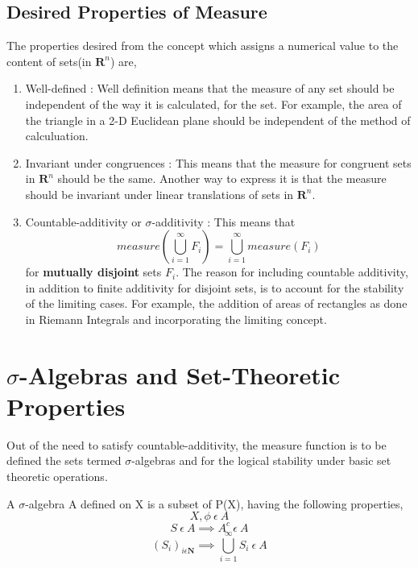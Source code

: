 \subsection{Desired Properties of Measure}
The properties desired from the concept which assigns a numerical value to the
content of sets(in $\bm{R}^n$) are,
\begin{enumerate}
    \item Well-defined : Well definition means that the measure of any set
        should be independent of the way it is calculated, for the set. For
        example, the area of the triangle in a 2-D Euclidean plane should be
        independent of the method of calculuation.
    \item Invariant under congruences : This means that the measure for
        congruent sets in $\bm{R}^n$ should be the same. Another way to express
        it is that the measure should be invariant under linear translations of
        sets in $\bm{R}^n$.
    \item Countable-additivity or $\sigma$-additivity : This means that 
        \begin{equation}
            measure(\bigcup_{i=1}^{\infty} F_{i}) = \bigcup_{i=1}^{\infty}
            measure(F_{i}) 
        \end{equation}
        for \textbf{mutually disjoint} sets $F_{i}$.
        The reason for including countable additivity, in addition to finite
        additivity for disjoint sets, is to account for the stability of the
        limiting cases. For example, the addition of areas of rectangles as done
        in Riemann Integrals and incorporating the limiting concept.
\end{enumerate}


\section{$\sigma$-Algebras and Set-Theoretic Properties}
Out of the need to satisfy countable-additivity, the measure function is to be
defined the sets termed $\sigma$-algebras and for the logical stability under
basic set theoretic operations.
\begin{definition}
    A $\sigma$-algebra A defined on X is a subset of P(X), having the following
    properties,
    \[
        X,\phi\:\epsilon\:A
    \]
    \[
        S\:\epsilon\:A \implies A^c \: \epsilon \: A
    \]    
    \[
        (S_i)_{i\epsilon\bm{N}} \implies \bigcup_{i=1}^{\infty} S_{i} \:
        \epsilon \: A
    \]
\end{definition}

